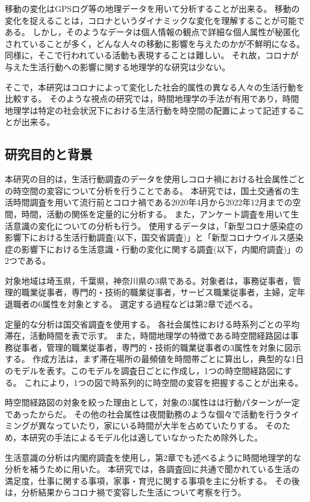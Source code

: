 \documentclass[paper={210mm,297mm},fontsize=15Q,line_length=35zw,number_of_lines=31,head_space=30mm,gutter=40mm,baselineskip=2.0zw,headfoot_verticalposition=1.5zw]{jlreq}
\begin{document}
移動の変化はGPSログ等の地理データを用いて分析することが出来る。
移動の変化を捉えることは，コロナというダイナミックな変化を理解することが可能である。
しかし，そのようなデータは個人情報の観点で詳細な個人属性が秘匿化されていることが多く，どんな人々の移動に影響を与えたのかが不鮮明になる。
同様に，そこで行われている活動も表現することは難しい。
それ故，コロナが与えた生活行動への影響に関する地理学的な研究は少ない。

そこで，本研究はコロナによって変化した社会的属性の異なる人々の生活行動を比較する。
そのような視点の研究では，時間地理学の手法が有用であり，時間地理学は特定の社会状況下における生活行動を時空間の配置によって記述することが出来る。\\

\subsection{研究目的と背景}

本研究の目的は，生活行動調査のデータを使用しコロナ禍における社会属性ごとの時空間の変容について分析を行うことである。
本研究では，国土交通省の生活時間調査を用いて流行前とコロナ禍である2020年4月から2022年12月までの空間，時間，活動の関係を定量的に分析する。
また，アンケート調査を用いて生活意識の変化についての分析も行う。
使用するデータは，「新型コロナ感染症の影響下における生活行動調査(以下，国交省調査)」と「新型コロナウイルス感染症の影響下における生活意識・行動の変化に関する調査(以下，内閣府調査)」の2つである。

対象地域は埼玉県，千葉県，神奈川県の3県である。対象者は，事務従事者，管理的職業従事者，専門的・技術的職業従事者，サービス職業従事者，主婦，定年退職者の6属性を対象とする。
選定する過程などは第2章で述べる。

定量的な分析は国交省調査を使用する。
各社会属性における時系列ごとの平均滞在，活動時間を表で示す。
また，時間地理学の特徴である時空間経路図は事務従事者，管理的職業従事者，専門的・技術的職業従事者の3属性を対象に図示する。
作成方法は，まず滞在場所の最頻値を時間帯ごとに算出し，典型的な1日のモデルを表す。このモデルを調査日ごとに作成し，1つの時空間経路図にする。
これにより，1つの図で時系列的に時空間の変容を把握することが出来る。

時空間経路図の対象を絞った理由として，対象の3属性はは行動パターンが一定であったからだ。
その他の社会属性は夜間勤務のような個々で活動を行うタイミングが異なっていたり，家にいる時間が大半を占めていたりする。
そのため，本研究の手法によるモデル化は適していなかったため除外した。

生活意識の分析は内閣府調査を使用し，第2章でも述べるように時間地理学的な分析を補うために用いた。
本研究では，各調査回に共通で聞かれている生活の満足度，仕事に関する事項，家事・育児に関する事項を主に分析する。
その後は，分析結果からコロナ禍で変容した生活について考察を行う。
\end{document}
